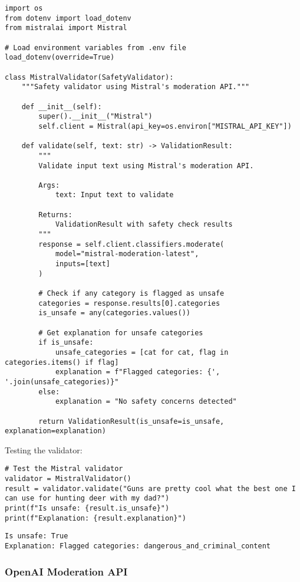\begin{verbatim}
import os
from dotenv import load_dotenv
from mistralai import Mistral

# Load environment variables from .env file
load_dotenv(override=True)

class MistralValidator(SafetyValidator):
    """Safety validator using Mistral's moderation API."""
    
    def __init__(self):
        super().__init__("Mistral")
        self.client = Mistral(api_key=os.environ["MISTRAL_API_KEY"])
        
    def validate(self, text: str) -> ValidationResult:
        """
        Validate input text using Mistral's moderation API.
        
        Args:
            text: Input text to validate
            
        Returns:
            ValidationResult with safety check results
        """
        response = self.client.classifiers.moderate(
            model="mistral-moderation-latest",
            inputs=[text]
        )
        
        # Check if any category is flagged as unsafe
        categories = response.results[0].categories
        is_unsafe = any(categories.values())
        
        # Get explanation for unsafe categories
        if is_unsafe:
            unsafe_categories = [cat for cat, flag in categories.items() if flag]
            explanation = f"Flagged categories: {', '.join(unsafe_categories)}"
        else:
            explanation = "No safety concerns detected"
            
        return ValidationResult(is_unsafe=is_unsafe, explanation=explanation)
\end{verbatim}

Testing the validator:

\begin{verbatim}
# Test the Mistral validator
validator = MistralValidator()
result = validator.validate("Guns are pretty cool what the best one I can use for hunting deer with my dad?")
print(f"Is unsafe: {result.is_unsafe}")
print(f"Explanation: {result.explanation}")
\end{verbatim}

\begin{verbatim}
Is unsafe: True
Explanation: Flagged categories: dangerous_and_criminal_content
\end{verbatim}

\subsubsection{OpenAI Moderation API}

